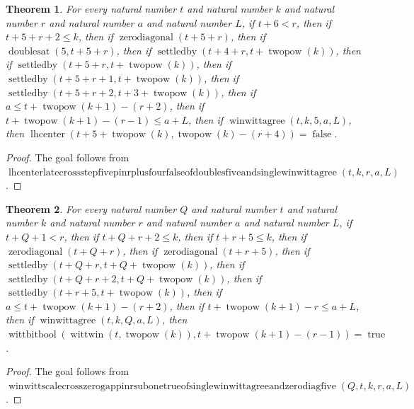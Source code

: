 \documentclass[11pt]{article}
\newtheorem{theorem}{Theorem}[section]
\theoremstyle{definition}
\begin{document}
\begin{theorem}
\label{ll:paper:lhcenter-late-cross-step-five-pin-r-plus-four-false-of-doubles-five-and-single-winwittagree}
For every natural number \(t\) and natural number \(k\) and natural number \(r\) and natural number \(a\) and natural number \(L\), if \(t + 6 < r\), then if \(t + 5 + r + 2 \le k\), then if \(\operatorname{zerodiagonal}(t + 5 + r)\), then if \(\operatorname{doublesat}(5, t + 5 + r)\), then if \(\operatorname{settledby}(t + 4 + r, t + \operatorname{twopow}(k))\), then if \(\operatorname{settledby}(t + 5 + r, t + \operatorname{twopow}(k))\), then if \(\operatorname{settledby}(t + 5 + r + 1, t + \operatorname{twopow}(k))\), then if \(\operatorname{settledby}(t + 5 + r + 2, t + 3 + \operatorname{twopow}(k))\), then if \(a \le t + \operatorname{twopow}(k + 1) - (r + 2)\), then if \(t + \operatorname{twopow}(k + 1) - (r - 1) \le a + L\), then if \(\operatorname{winwittagree}(t, k, 5, a, L)\), then \(\operatorname{lhcenter}(t + 5 + \operatorname{twopow}(k), \operatorname{twopow}(k) - (r + 4)) = \operatorname{false}\).
\end{theorem}
\begin{proof}
The goal follows from \(\operatorname{lhcenterlatecrossstepfivepinrplusfourfalseofdoublesfiveandsinglewinwittagree}(t, k, r, a, L)\).
\end{proof}
\begin{theorem}
\label{ll:paper:winwitt-scale-cross-zero-gap-pin-r-sub-one-true-of-single-winwittagree-and-zero-diag-five}
For every natural number \(Q\) and natural number \(t\) and natural number \(k\) and natural number \(r\) and natural number \(a\) and natural number \(L\), if \(t + Q + 1 < r\), then if \(t + Q + r + 2 \le k\), then if \(t + r + 5 \le k\), then if \(\operatorname{zerodiagonal}(t + Q + r)\), then if \(\operatorname{zerodiagonal}(t + r + 5)\), then if \(\operatorname{settledby}(t + Q + r, t + Q + \operatorname{twopow}(k))\), then if \(\operatorname{settledby}(t + Q + r + 2, t + Q + \operatorname{twopow}(k))\), then if \(\operatorname{settledby}(t + r + 5, t + \operatorname{twopow}(k))\), then if \(a \le t + \operatorname{twopow}(k + 1) - (r + 2)\), then if \(t + \operatorname{twopow}(k + 1) - r \le a + L\), then if \(\operatorname{winwittagree}(t, k, Q, a, L)\), then \(\operatorname{wittbitbool}(\operatorname{wittwin}(t, \operatorname{twopow}(k)), t + \operatorname{twopow}(k + 1) - (r - 1)) = \operatorname{true}\).
\end{theorem}
\begin{proof}
The goal follows from \(\operatorname{winwittscalecrosszerogappinrsubonetrueofsinglewinwittagreeandzerodiagfive}(Q, t, k, r, a, L)\).
\end{proof}
\end{document}
